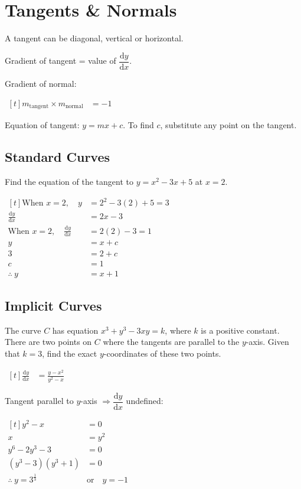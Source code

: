 \documentclass[a4paper,11pt,oneside]{book}
\providecommand{\cdisp}[1]{\par\noindent$\displaystyle\begin{aligned}[t]#1\end{aligned}$\par\smallskip}
\renewcommand{\cdisp}[1]{\par\noindent\hfill$\displaystyle\begin{aligned}[t]#1\end{aligned}$\hfill\null\par\smallskip}
\begin{document}
\section{Tangents \& Normals}
A tangent can be diagonal, vertical or horizontal.\par
Gradient of tangent = value of $\dfrac{\mathrm{d}y}{\mathrm{d}x}$.\par
Gradient of normal:
\cdisp{m_{\text{tangent}}\times m_{\text{normal}}&=-1}
Equation of tangent: $y=mx+c$. To find $c$, substitute any point on the tangent.\par\smallskip
\noindent{}\par
\subsection{Standard Curves}
\exlab
Find the equation of the tangent to $y=x^{2}-3x+5$ at $x=2$.
\cdisp{\text{When }x=2,\quad y&=2^{2}-3(2)+5=3\\
\frac{\mathrm{d}y}{\mathrm{d}x}&=2x-3\\
\text{When }x=2,\quad\frac{\mathrm{d}y}{\mathrm{d}x}&=2(2)-3=1\\
y&=x+c\\
3&=2+c\\
c&=1\\
\therefore\ y&=x+1}
\subsection{Implicit Curves}
\par
The curve $C$ has equation $x^{3}+y^{3}-3xy=k$, where $k$ is a positive constant. There are two points on $C$ where the tangents are parallel to the $y$-axis. Given that $k=3$, find the exact $y$-coordinates of these two points.
\cdisp{\frac{\mathrm{d}y}{\mathrm{d}x}&=\frac{y-x^{2}}{y^{2}-x}}
Tangent parallel to $y$-axis $\Rightarrow\dfrac{\mathrm{d}y}{\mathrm{d}x}$ undefined:
\cdisp{y^{2}-x&=0\\
x&=y^{2}\\
y^{6}-2y^{3}-3&=0\\
\left(y^{3}-3\right)\left(y^{3}+1\right)&=0\\
\therefore\ y=3^{\frac{1}{3}}\quad&\text{or}\quad y=-1}
\end{document}
